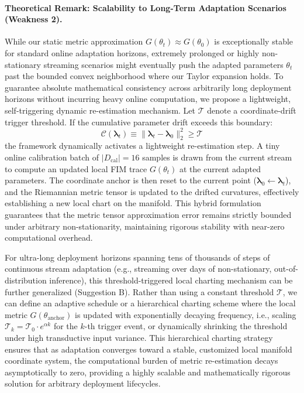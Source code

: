 \paragraph{Theoretical Remark: Scalability to Long-Term Adaptation Scenarios (Weakness 2).} 
While our static metric approximation $G(\theta_t) \approx G(\theta_0)$ is exceptionally stable for standard online adaptation horizons, extremely prolonged or highly non-stationary streaming scenarios might eventually push the adapted parameters $\theta_t$ past the bounded convex neighborhood where our Taylor expansion holds. To guarantee absolute mathematical consistency across arbitrarily long deployment horizons without incurring heavy online computation, we propose a lightweight, self-triggering dynamic re-estimation mechanism. Let $\mathcal{T}$ denote a coordinate-drift trigger threshold. If the cumulative parameter drift exceeds this boundary:
\begin{equation}
\label{eq:drift_trigger}
\mathcal{C}(\boldsymbol{\lambda}_t) \equiv \|\boldsymbol{\lambda}_t - \boldsymbol{\lambda}_0\|_2^2 \ge \mathcal{T}
\end{equation}
the framework dynamically activates a lightweight re-estimation step. A tiny online calibration batch of $|D_{\text{cal}}| = 16$ samples is drawn from the current stream to compute an updated local FIM trace $G(\theta_t)$ at the current adapted parameters. The coordinate anchor is then reset to the current point ($\boldsymbol{\lambda}_0 \gets \boldsymbol{\lambda}_t$), and the Riemannian metric tensor is updated to the drifted curvatures, effectively establishing a new local chart on the manifold. This hybrid formulation guarantees that the metric tensor approximation error remains strictly bounded under arbitrary non-stationarity, maintaining rigorous stability with near-zero computational overhead.

For ultra-long deployment horizons spanning tens of thousands of steps of continuous stream adaptation (e.g., streaming over days of non-stationary, out-of-distribution inference), this threshold-triggered local charting mechanism can be further generalized (Suggestion B). Rather than using a constant threshold $\mathcal{T}$, we can define an adaptive schedule or a hierarchical charting scheme where the local metric $G(\theta_{\text{anchor}})$ is updated with exponentially decaying frequency, i.e., scaling $\mathcal{T}_k = \mathcal{T}_0 \cdot e^{\alpha k}$ for the $k$-th trigger event, or dynamically shrinking the threshold under high transductive input variance. This hierarchical charting strategy ensures that as adaptation converges toward a stable, customized local manifold coordinate system, the computational burden of metric re-estimation decays asymptotically to zero, providing a highly scalable and mathematically rigorous solution for arbitrary deployment lifecycles.

